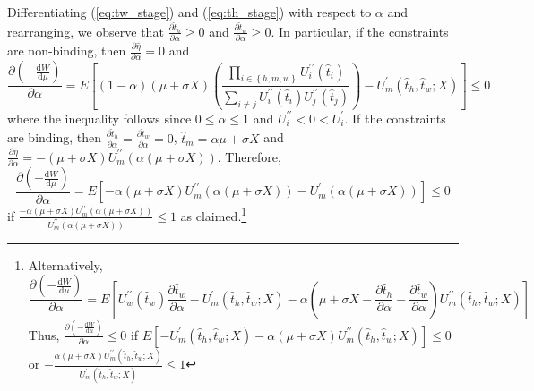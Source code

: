 \documentclass[12pt,a4paper,british]{article}
\makeatletter
\newenvironment{proof}[1][\proofname]{\par
    \normalfont\topsep6\p@\@plus6\p@\relax
    \trivlist
    \itemindent\parindent
    \item[\hskip\labelsep
          \scshape
      #1]\ignorespaces
  }{%
    \endtrivlist\@endpefalse
  }
\providecommand{\proofname}{Proof}
\makeatother
\begin{document}
\begin{proof}
	
	Differentiating (\ref{eq:tw_stage}) and (\ref{eq:th_stage}) with respect to $\alpha$ and rearranging, we observe that $\frac{\partial\hat{t}_{h}}{\partial\alpha} \geq 0$ and $\frac{\partial\hat{t}_{w}}{\partial\alpha}\geq0$. In particular, if the constraints are non-binding, then $\frac{\partial\hat{\eta}}{\partial\alpha}=0 $ and
	\begin{equation*}
	\frac{\partial\left(-\frac{\mathrm{d}W}{\mathrm{d}\mu}\right)}{\partial\alpha} = E\left[\left(1-\alpha\right)  \left( \mu + \sigma X \right) \left(\frac{\prod_{i \in\left\{ h, m, w \right\}}U_{i}^{\prime\prime}\left(\hat{t}_{i}\right)}{\sum_{i\neq j}U_{i}^{\prime\prime}\left(\hat{t}_{i}\right)U_{j}^{\prime\prime}\left(\hat{t}_{j}\right)}\right)-U_{m}^{\prime}\left(\hat{t}_{h}, \hat{t}_{w}; X\right)\right] \leq 0
	\end{equation*}
	where the inequality follows since $0 \leq \alpha \leq 1$ and $U^{\prime\prime}_i < 0 < U^{\prime}_i$.  If the constraints are binding, then $\frac{\partial\hat{t}_{h}}{\partial\alpha}=\frac{\partial\hat{t}_{w}}{\partial\alpha}=0$, $\hat{t}_{m}=\alpha \mu + \sigma X$ and $\frac{\partial\hat{\eta}}{\partial\alpha}=-(\mu+\sigma X) U_{m}^{\prime\prime}\left(\alpha (\mu+\sigma X) \right)$. Therefore,
	\begin{equation*}
	\frac{\partial\left(-\frac{\mathrm{d}W}{\mathrm{d} \mu}\right)}{\partial\alpha}= E\left[-\alpha (\mu + \sigma X) U_{m}^{\prime\prime}\left(\alpha (\mu+\sigma X) \right)-U_{m}^{\prime}\left(\alpha (\mu+\sigma X) \right)\right] \leq 0
	\end{equation*}
	if $\frac{-\alpha (\mu+\sigma X) U_m^{\prime\prime} \left(\alpha (\mu+\sigma X)\right)}{U_m^{\prime\prime} \left(\alpha (\mu+\sigma X)\right)} \leq 1$ as claimed.\footnote{\color{red}Alternatively, 
		\begin{equation*}
			\frac{\partial\left(-\frac{\mathrm{d}W}{\mathrm{d}\mu}\right)}{\partial\alpha}=E\left[U_{w}^{\prime\prime}\left(\hat{t}_{w}\right)\frac{\partial\hat{t}_{w}}{\partial\alpha}-U_{m}^{\prime}\left(\hat{t}_{h},\hat{t}_{w};X\right)-\alpha\left(\mu+\sigma X-\frac{\partial\hat{t}_{h}}{\partial\alpha}-\frac{\partial\hat{t}_{w}}{\partial\alpha}\right)U_{m}^{\prime\prime}\left(\hat{t}_{h},\hat{t}_{w};X\right)\right]
		\end{equation*}
		Thus,  $\frac{\partial\left( -\frac{\mathrm{d}W} {\mathrm{d}\mu}\right)} {\partial\alpha} \leq 0$ if $ E\left[-U_{m}^{\prime}\left(\hat{t}_{h},\hat{t}_{w};X\right)-\alpha\left(\mu+\sigma X\right)U_{m}^{\prime\prime}\left(\hat{t}_{h},\hat{t}_{w};X\right)\right] \leq 0$ or $-\frac{\alpha\left(\mu+\sigma X\right)U_{m}^{\prime\prime}\left(\hat{t}_{h},\hat{t}_{w};X\right)}{U_{m}^{\prime}\left(\hat{t}_{h},\hat{t}_{w};X\right)} \leq 1$
	}

\end{proof}
\end{document}
